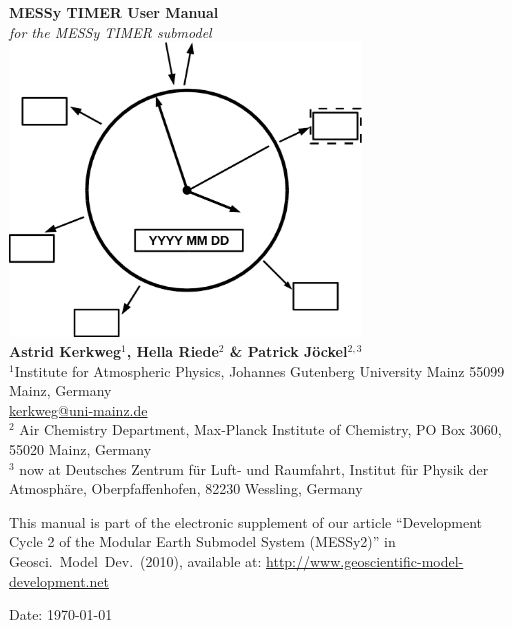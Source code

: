 \documentclass[twoside]{article}
\begin{document}
\thispagestyle{empty}
\begin{center}
  {\Huge\bf MESSy TIMER User Manual}\\[3mm]
  {\huge\it for the MESSy TIMER submodel}\\[9mm]
  {\includegraphics[width=0.7\textwidth]{timer_logo}}\\[9mm]
  {\huge\bf Astrid Kerkweg$^1$, Hella Riede$^2$ \& Patrick J\"ockel$^{2,3}$}\\[9mm]
  \small
  $^1$Institute for Atmospheric Physics,
  Johannes Gutenberg University Mainz
  55099 Mainz, Germany\\
  \url{kerkweg@uni-mainz.de}\\[3mm]

  $^2$
  Air Chemistry Department,
  Max-Planck Institute of Chemistry,
  PO Box 3060, 55020 Mainz, Germany\\

  $^3$ now at
  Deutsches Zentrum f\"{u}r Luft- und Raumfahrt,
  Institut f\"{u}r Physik der Atmosph\"{a}re,
  Oberpfaffenhofen, 82230 Wessling, Germany\\

\end{center}

\vfill

{\large This manual is part of the electronic supplement of our article
``Development Cycle 2 of the Modular Earth Submodel System (MESSy2)''
  in Geosci.\ Model\ Dev.\
  (2010), available at: \url{http://www.geoscientific-model-development.net}}

\begin{center}
  Date: \today
\end{center}
\end{document}

